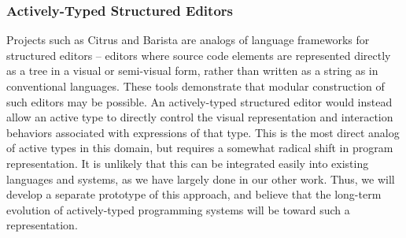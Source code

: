 \subsubsection{Actively-Typed Structured Editors}
Projects such as Citrus \cite{Ko05} and Barista \cite{Ko06} are analogs of language frameworks for structured editors -- editors where source code elements are represented directly as a tree in a visual or semi-visual form, rather than written as a string as in conventional languages. These tools demonstrate that modular construction of such editors may be possible. An actively-typed structured editor would instead allow an active type to directly control the visual representation and interaction behaviors associated with expressions of that type. This is the most direct analog of active types in this domain, but requires a somewhat radical shift in program representation. It is unlikely that this can be integrated easily into existing languages and systems, as we have largely done in our other work. Thus, we will develop a separate prototype of this approach, and believe that the long-term evolution of actively-typed programming systems will be toward such a representation.
